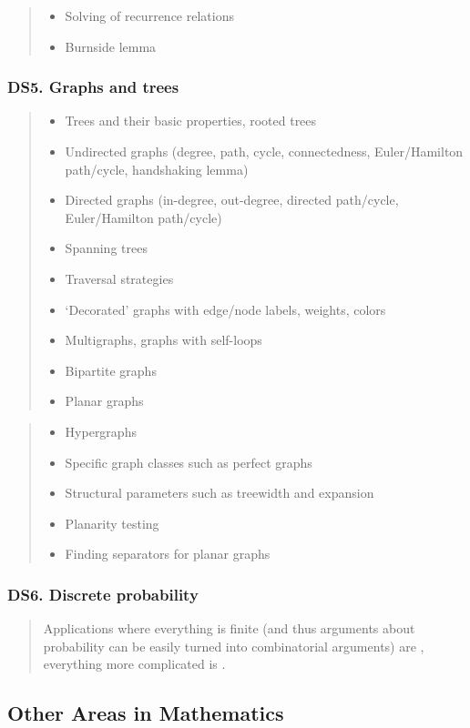 \documentclass[a4paper,11pt,oneside]{article}
\newcommand{\cmark}{\ding{51}}%
\newcommand{\xmark}{\ding{55}}%
\newcommand{\CC}[1]{#1}
\newcommand{\cdefi}{{\small\cmark\faFileTextO}}
\newcommand{\ccode}{{\small\cmark\faFileText}}
\newcommand{\cnfoc}{{\small\faQuestion}}
\newcommand{\cexcl}{{\small\xmark}}
\newcommand{\Idefine}{\item[\hbox to 1.8em{\cdefi\hfill}]}
\newcommand{\Icodeonly}{\item[\hbox to 1.8em{\ccode\hfill}]}
\newcommand{\Iexcluded}{\item[\hbox to 1.8em{\cexcl\hfill}]}
\newenvironment{myitemize}{\begin{quote}\begin{itemize}\itemsep 0pt}{\end{itemize}\end{quote}}
\begin{document}
        \begin{myitemize}
        \Iexcluded Solving of recurrence relations
        \Iexcluded Burnside lemma
        \end{myitemize}
  
    \subsubsection*{DS5. Graphs and trees}

        \begin{myitemize}
        \Idefine\CC{Trees} and their basic properties, rooted trees
        \Idefine\CC{Undirected graphs} (degree, path, cycle, connectedness, Euler/Hamil\-ton path/cycle, handshaking lemma)
        \Idefine\CC{Directed graphs} (in-degree, out-degree, directed path/cycle, Euler/Hamilton path/cycle)
        \Idefine\CC{Spanning trees}
        \Idefine\CC{Traversal strategies}
        \Idefine `Decorated' graphs with edge/node labels, weights, colors
        \Idefine Multigraphs, graphs with self-loops
        \Idefine Bipartite graphs
        \Icodeonly Planar graphs
        \end{myitemize}

        \begin{myitemize}
        \Iexcluded Hypergraphs
        \Iexcluded Specific graph classes such as perfect graphs
        \Iexcluded Structural parameters such as treewidth and expansion
        \Iexcluded Planarity testing
        \Iexcluded Finding separators for planar graphs
        \end{myitemize}

    \subsubsection*{DS6. Discrete probability}
  
        \begin{quote}
        Applications where everything is finite (and thus arguments about probability can be easily
        turned into combinatorial arguments) are \cnfoc, everything more complicated
        is \cexcl.
        \end{quote}

\subsection {Other Areas in Mathematics}%
\label{subsubsec:other-mathematics}
\end{document}
